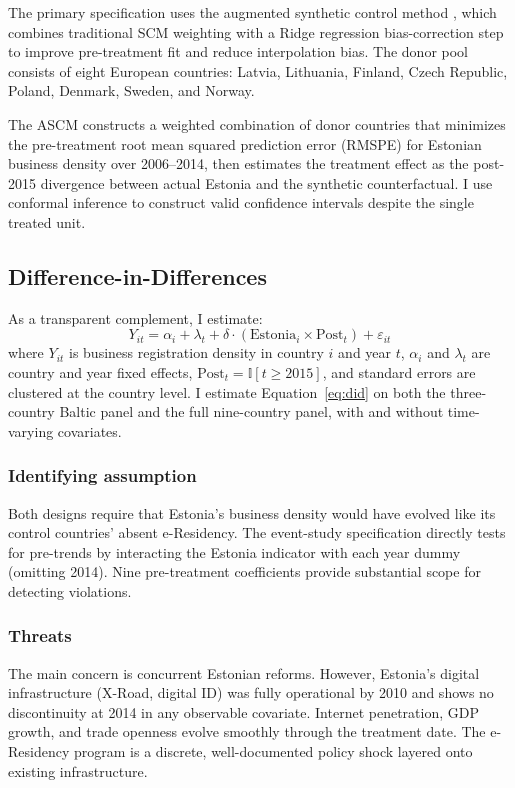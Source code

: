 \documentclass[12pt]{article}
\newcommand{\ind}{\mathbb{I}}
\begin{document}
The primary specification uses the augmented synthetic control method \citep[ASCM;][]{benmelech2021}, which combines traditional SCM weighting \citep{abadie2010, abadie2015} with a Ridge regression bias-correction step to improve pre-treatment fit and reduce interpolation bias. The donor pool consists of eight European countries: Latvia, Lithuania, Finland, Czech Republic, Poland, Denmark, Sweden, and Norway.

The ASCM constructs a weighted combination of donor countries that minimizes the pre-treatment root mean squared prediction error (RMSPE) for Estonian business density over 2006--2014, then estimates the treatment effect as the post-2015 divergence between actual Estonia and the synthetic counterfactual. I use conformal inference \citep{chernozhukov2021} to construct valid confidence intervals despite the single treated unit.

\subsection{Difference-in-Differences}

As a transparent complement, I estimate:
\begin{equation}
Y_{it} = \alpha_i + \lambda_t + \delta \cdot (\text{Estonia}_i \times \text{Post}_t) + \varepsilon_{it}
\label{eq:did}
\end{equation}
where $Y_{it}$ is business registration density in country $i$ and year $t$, $\alpha_i$ and $\lambda_t$ are country and year fixed effects, $\text{Post}_t = \ind[t \geq 2015]$, and standard errors are clustered at the country level. I estimate Equation~\ref{eq:did} on both the three-country Baltic panel and the full nine-country panel, with and without time-varying covariates.

\subsubsection*{Identifying assumption} Both designs require that Estonia's business density would have evolved like its control countries' absent e-Residency. The event-study specification directly tests for pre-trends by interacting the Estonia indicator with each year dummy (omitting 2014). Nine pre-treatment coefficients provide substantial scope for detecting violations.

\subsubsection*{Threats} The main concern is concurrent Estonian reforms. However, Estonia's digital infrastructure (X-Road, digital ID) was fully operational by 2010 and shows no discontinuity at 2014 in any observable covariate. Internet penetration, GDP growth, and trade openness evolve smoothly through the treatment date. The e-Residency program is a discrete, well-documented policy shock layered onto existing infrastructure.
\end{document}
